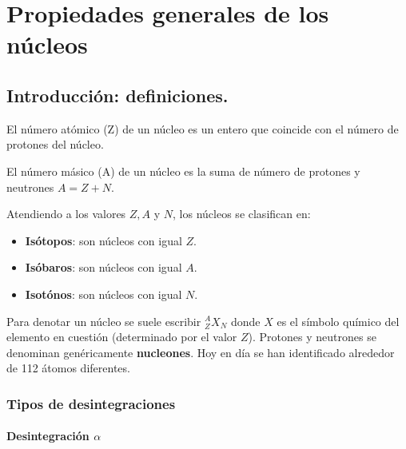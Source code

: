 
\chapter{Propiedades generales de los núcleos}


\section{Introducción: definiciones.}

\begin{definition}
	El número atómico (Z) de un núcleo es un entero que coincide con el número de protones del núcleo.
\end{definition}


\begin{definition}
	El número másico (A) de un núcleo es la suma de número de protones y neutrones $A=Z+N$.
\end{definition}

Atendiendo a los valores $Z,A$ y $N$, los núcleos se clasifican en:

\begin{itemize}
	\item \textbf{Isótopos}: son núcleos con igual $Z$.
	\item \textbf{Isóbaros}: son núcleos con igual $A$.
	\item \textbf{Isotónos}: son núcleos con igual $N$.
\end{itemize}

Para denotar un núcleo se suele escribir $^A_Z X_N$ donde $X$ es el símbolo químico del elemento en cuestión (determinado por el valor $Z$). Protones y neutrones se denominan genéricamente \textbf{nucleones}. Hoy en día se han identificado alrededor de 112 átomos diferentes.

\subsection{Tipos de desintegraciones}

\subsubsection{Desintegración $\alpha$}


